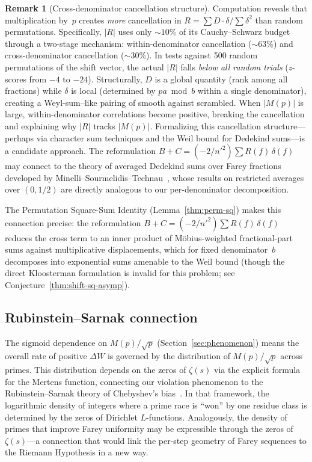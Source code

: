 \documentclass[11pt]{article}
\theoremstyle{definition}
\newtheorem{remark}[theorem]{Remark}
\begin{document}
\begin{remark}[Cross-denominator cancellation structure]
\label{rem:R-cancel}
Computation reveals that multiplication by~$p$ creates
\emph{more} cancellation in $R = \sum D \cdot \delta / \sum \delta^2$
than random permutations.  Specifically, $|R|$ uses only
${\sim}10\%$ of its Cauchy--Schwarz budget through a two-stage
mechanism: within-denominator cancellation (${\sim}63\%$)
and cross-denominator cancellation (${\sim}30\%$).  In tests
against 500 random permutations of the shift vector, the
actual $|R|$ falls \emph{below all random trials} ($z$-scores
from $-4$ to $-24$).  Structurally, $D$ is a global quantity
(rank among all fractions) while $\delta$ is local (determined
by $pa \bmod b$ within a single denominator), creating a
Weyl-sum--like pairing of smooth against scrambled.  When
$|M(p)|$ is large, within-denominator correlations become
positive, breaking the cancellation and explaining why
$|R|$ tracks $|M(p)|$.  Formalizing this cancellation
structure---perhaps via character sum techniques and the
Weil bound for Dedekind sums---is a candidate approach.
The reformulation $B + C = (-2/{n'}^2)\sum R(f)\,\delta(f)$
may connect to the theory of averaged Dedekind sums over
Farey fractions developed by
Minelli--Sourmelidis--Technau~\cite{Minelli2023a,Minelli2023b},
whose results on restricted averages over $(0,1/2)$ are
directly analogous to our per-denominator decomposition.

The Permutation Square-Sum Identity
(Lemma~\ref{thm:perm-sq}) makes this connection
precise: the reformulation $B + C = (-2/{n'}^2)\sum R(f)\,\delta(f)$
reduces the cross term to an inner product of
M\"obius-weighted fractional-part sums against
multiplicative displacements, which for fixed denominator~$b$
decomposes into exponential sums amenable to the
Weil bound (though the direct Kloosterman formulation
is invalid for this problem; see Conjecture~\ref{thm:shift-sq-asymp}).
\end{remark}

\subsection{Rubinstein--Sarnak connection}

The sigmoid dependence on $M(p)/\sqrt{p}$ (Section~\ref{sec:phenomenon})
means the overall rate of positive $\Delta W$ is governed by the distribution
of $M(p)/\sqrt{p}$ across primes.  This distribution depends on
the zeros of $\zeta(s)$ via the explicit formula for the Mertens
function, connecting our violation phenomenon to the
Rubinstein--Sarnak theory of Chebyshev's
bias~\cite{RubinsteinSarnak1994}.  In that framework, the
logarithmic density of integers where a prime race is ``won'' by
one residue class is determined by the zeros of Dirichlet
$L$-functions.  Analogously, the density of primes that
improve Farey uniformity may be expressible through the zeros
of~$\zeta(s)$---a connection that would link the per-step
geometry of Farey sequences to the Riemann Hypothesis in a
new way.
\end{document}
